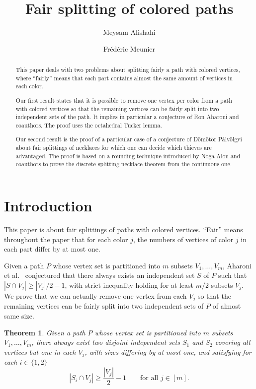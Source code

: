 \documentclass[12pt]{amsart}
\author{Meysam Alishahi}
\author{Fr\'ed\'eric Meunier}
\title{Fair splitting of colored paths}
\newtheorem{theorem}{Theorem}
\theoremstyle{remark}
\begin{document}
\maketitle

\begin{abstract}
This paper deals with two problems about  splitting fairly a path with colored vertices, where ``fairly'' means that each part contains almost the same amount of vertices in each color. 

Our first result states that it is possible to remove one vertex per color from a path with colored vertices so that the remaining vertices can be fairly split into two independent sets of the path. 
It implies in particular a conjecture of Ron Aharoni and coauthors. The proof uses the octahedral Tucker lemma.

Our second result is the proof of a particular case of a conjecture of D{\"o}m{\"o}t{\"o}r P{\'a}lv{\"o}lgyi about fair splittings of necklaces for which one can decide which thieves are advantaged. The proof is based on a rounding technique introduced by Noga Alon and coauthors to prove the discrete splitting necklace theorem from the continuous one.
\end{abstract}

\section{Introduction}

This paper is about fair splittings of paths with colored vertices. ``Fair'' means throughout the paper that for each color $j$, the numbers of vertices of color $j$ in each part differ by at most one.

Given a path $P$ whose vertex set is partitioned into $m$ subsets $V_1,\ldots,V_m$, Aharoni et al.~\cite[Conjecture 1.6]{aharoni2016fair} conjectured that there always exists an independent set $S$ of $P$ such that $|S\cap V_j|\geq |V_j|/2-1$, with strict inequality holding for at least $m/2$ subsets $V_j$. 
 We prove that we can actually remove one vertex from each $V_j$ so that the remaining vertices can be fairly split into two independent sets of $P$ of almost same size. 

 \begin{theorem}\label{main}
Given a path $P$ whose vertex set is partitioned into $m$ subsets $V_1,\ldots,V_m$, there always exist two disjoint independent sets $S_1$ and $S_2$ covering all vertices but one in each $V_j$, with sizes differing by at most one, and satisfying for each $i\in\{1,2\}$
$$ |S_i\cap V_j| \geq  \frac{|V_j|} 2 -1\qquad\mbox{for all $j\in[m]$.}$$
\end{theorem}
\end{document}
